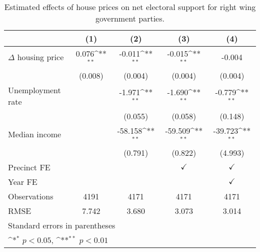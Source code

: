 \begin{table}[htbp]\centering
\def\sym#1{\ifmmode^{#1}\else\(^{#1}\)\fi}
\caption{Estimated effects of house prices on net electoral support for right wing government parties.} \label{prelagdv}
\begin{tabular}{l*{4}{c}}
\hline\hline
                    &\multicolumn{1}{c}{(1)}        &\multicolumn{1}{c}{(2)}        &\multicolumn{1}{c}{(3)}        &\multicolumn{1}{c}{(4)}        \\
\hline
$\Delta$ housing price&       0.076\sym{**}&      -0.011\sym{**}&      -0.015\sym{**}&      -0.004        \\
                    &     (0.008)        &     (0.004)        &     (0.004)        &     (0.004)        \\
[1em]
Unemployment rate   &                    &      -1.971\sym{**}&      -1.690\sym{**}&      -0.779\sym{**}\\
                    &                    &     (0.055)        &     (0.058)        &     (0.148)        \\
[1em]
Median income       &                    &     -58.158\sym{**}&     -59.509\sym{**}&     -39.723\sym{**}\\
                    &                    &     (0.791)        &     (0.822)        &     (4.993)        \\
[1em]
\hline Precinct FE  &                    &                    &$\checkmark$        &$\checkmark$        \\
[1em]
Year FE             &                    &                    &                    &$\checkmark$        \\
\hline
Observations        &        4191        &        4171        &        4171        &        4171        \\
RMSE                &       7.742        &       3.680        &       3.073        &       3.014        \\
\hline\hline
\multicolumn{5}{l}{\footnotesize Standard errors in parentheses}\\
\multicolumn{5}{l}{\footnotesize \sym{*} \(p<0.05\), \sym{**} \(p<0.01\)}\\
\end{tabular}
\end{table}
